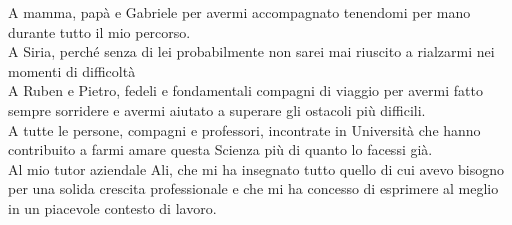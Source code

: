 \cleardoublepage
\begingroup
\let\clearpage\endgroup
\null{}

\begin{flushright}
\begin{minipage}{5.3in}
\begin{flushright}
\begin{em}
A mamma, papà e Gabriele per avermi accompagnato tenendomi per mano durante tutto il mio percorso.
\\[12pt]
A Siria, perché senza di lei probabilmente non sarei mai riuscito a rialzarmi nei momenti di difficoltà
\\[12pt]
A Ruben e Pietro, fedeli e fondamentali compagni di viaggio per avermi fatto sempre sorridere e avermi aiutato a superare gli ostacoli più difficili.
\\[12pt]
A tutte le persone, compagni e professori, incontrate in Università che hanno contribuito a farmi amare questa Scienza più di quanto lo facessi già.
\\[12pt]
Al mio tutor aziendale Ali, che mi ha insegnato tutto quello di cui avevo bisogno per una solida crescita professionale e che mi ha concesso di esprimere al meglio in un piacevole contesto di lavoro. 
\end{em}
\end{flushright}
\end{minipage}
\end{flushright}
 \null
